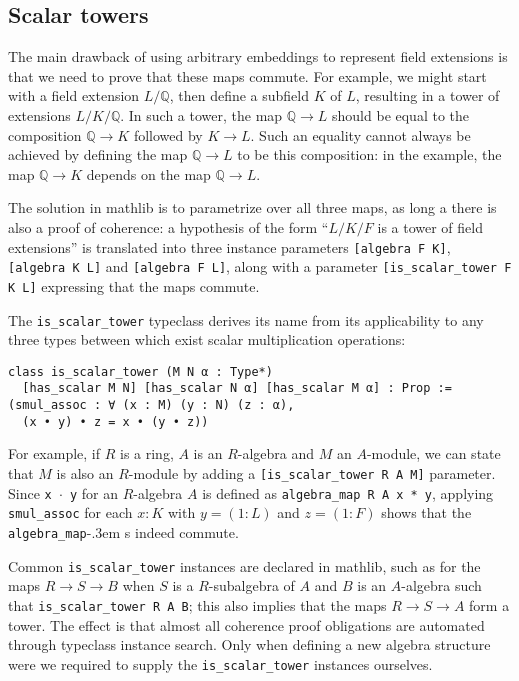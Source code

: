 \documentclass[sn-mathphys]{sn-jnl}%
\newcommand{\lean}[1]{\texttt{#1}\xspace}
\newcommand{\mathlib}{\textsf{mathlib}\xspace}
\newcommand{\QQ}{\mathbb{Q}}
\begin{document}
\subsection{Scalar towers} \label{sec:scalar_tower}

The main drawback of using arbitrary embeddings to represent field extensions is that we need to prove that these maps commute.
For example, we might start with a field extension $L / \QQ$, then define a subfield $K$ of $L$,
resulting in a tower of extensions $L / K / \QQ$.
In such a tower, the map $\QQ \to L$ should be equal to the composition $\QQ \to K$ followed by $K \to L$.
Such an equality cannot always be achieved by defining the map $\QQ \to L$ to be this composition: in the example, the map $\QQ \to K$ depends on the map $\QQ \to L$.

The solution in \mathlib is to parametrize over all three maps, as long a there is also a proof of coherence:
a hypothesis of the form ``$L / K / F$ is a tower of field extensions'' is translated into three instance parameters \lean{[algebra F K]}, \lean{[algebra K L]} and \lean{[algebra F L]},
along with a parameter \lean{[is\_scalar\_tower F K L]} expressing that the maps commute.

The \lean{is\_scalar\_tower} typeclass derives its name from its applicability to any three types between which exist scalar multiplication operations:
\begin{lstlisting}
class is_scalar_tower (M N α : Type*)
  [has_scalar M N] [has_scalar N α] [has_scalar M α] : Prop :=
(smul_assoc : ∀ (x : M) (y : N) (z : α),
  (x • y) • z = x • (y • z))
\end{lstlisting}
For example, if $R$ is a ring, $A$ is an $R$-algebra and $M$ an $A$-module, we can state that $M$ is also an $R$-module by adding a \lean{[is\_scalar\_tower R A M]} parameter.
Since \lean{x~$\cdot$~y} for an $R$-algebra $A$ is defined as \lean{algebra\_map R A x * y}, applying \lean{smul\_assoc} for each $x : K$ with $y = (1 : L)$ and $z = (1 : F)$ shows that the \lean{algebra\_map}\kern-.3em s indeed commute.

Common \lean{is\_scalar\_tower} instances are declared in \mathlib,
such as for the maps $R \to S \to B$ when $S$ is a $R$-subalgebra of $A$ and $B$ is an $A$-algebra such that \lean{is\_scalar\_tower R A B};
this also implies that the maps $R \to S \to A$ form a tower.
The effect is that almost all coherence proof obligations are automated through typeclass instance search.
Only when defining a new algebra structure were we required to supply the \lean{is\_scalar\_tower} instances ourselves.
\end{document}
